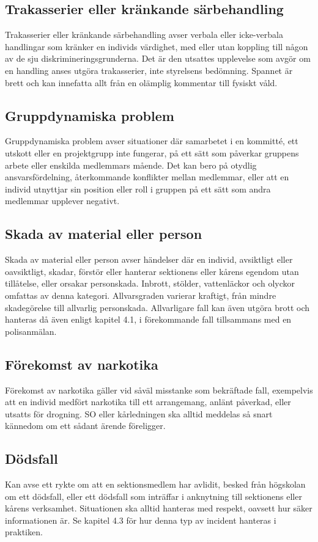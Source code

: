 \subsection{Trakasserier eller kränkande särbehandling}
Trakasserier eller kränkande särbehandling avser verbala eller icke-verbala handlingar som kränker en individs värdighet, med eller utan koppling till någon av de sju diskrimineringsgrunderna. Det är den utsattes upplevelse som avgör om en handling anses utgöra trakasserier, inte styrelsens bedömning. Spannet är brett och kan innefatta allt från en olämplig kommentar till fysiskt våld.

\subsection{Gruppdynamiska problem}
Gruppdynamiska problem avser situationer där samarbetet i en kommitté, ett utskott eller en projektgrupp inte fungerar, på ett sätt som påverkar gruppens arbete eller enskilda medlemmars mående. Det kan bero på otydlig ansvarsfördelning, återkommande konflikter mellan medlemmar, eller att en individ utnyttjar sin position eller roll i gruppen på ett sätt som andra medlemmar upplever negativt.

\subsection{Skada av material eller person}
Skada av material eller person avser händelser där en individ, avsiktligt eller oavsiktligt, skadar, förstör eller hanterar sektionens eller kårens egendom utan tillåtelse, eller orsakar personskada. Inbrott, stölder, vattenläckor och olyckor omfattas av denna kategori. Allvarsgraden varierar kraftigt, från mindre skadegörelse till allvarlig personskada. Allvarligare fall kan även utgöra brott och hanteras då även enligt kapitel 4.1, i förekommande fall tillsammans med en polisanmälan.

\subsection{Förekomst av narkotika}
Förekomst av narkotika gäller vid såväl misstanke som bekräftade fall, exempelvis att en individ medfört narkotika till ett arrangemang, anlänt påverkad, eller utsatts för drogning. SO eller kårledningen ska alltid meddelas så snart kännedom om ett sådant ärende föreligger.

\subsection{Dödsfall}
Kan avse ett rykte om att en sektionsmedlem har avlidit, besked från högskolan om ett dödsfall, eller ett dödsfall som inträffar i anknytning till sektionens eller kårens verksamhet. Situationen ska alltid hanteras med respekt, oavsett hur säker informationen är. Se kapitel 4.3 för hur denna typ av incident hanteras i praktiken.

